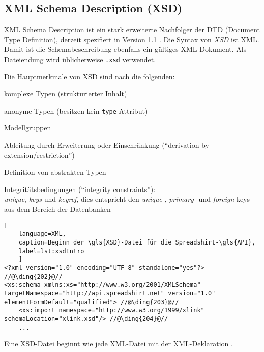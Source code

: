 \subsection{XML Schema Description (XSD)}
\label{sec:xsd}

\textsc{XML} Schema Description ist ein stark erweiterte Nachfolger der \gls{DTD} (Document Type Definition), derzeit spezifiert in Version 1.1 \cite{XMLSchema11Specification}. 
Die Syntax von \emph{\gls{XSD}} ist \gls{XML}. Damit ist die Schemabeschreibung ebenfalls ein gültiges \gls{XML}-Dokument. Als Dateiendung wird üblicherweise \texttt{.xsd} verwendet.

Die Hauptmerkmale von \gls{XSD} sind nach \cite[Kapitel 3.2][]{taxonomyXMLSchema} die folgenden:
\begin{compactitem}
    \item komplexe Typen (strukturierter Inhalt)
    \item anonyme Typen (besitzen kein \texttt{type}-Attribut)
    \item Modellgruppen
    \item Ableitung durch Erweiterung oder Einschränkung (\enquote{derivation by extension/restriction})
    \item Definition von abstrakten Typen
    \item Integritätsbedingungen (\enquote{integrity constraints}):\\
        \emph{unique}, \emph{keys} und \emph{keyref}, dies entspricht den \emph{unique-}, \emph{primary-} und \emph{foreign}-keys aus dem Bereich der Datenbanken        
\end{compactitem}

\begin{minipage}{\textwidth}
\begin{lstlisting}[
    language=XML,
    caption=Beginn der \gls{XSD}-Datei für die Spreadshirt-\gls{API},
    label=lst:xsdIntro
    ]
<?xml version="1.0" encoding="UTF-8" standalone="yes"?> //@\ding{202}@//
<xs:schema xmlns:xs="http://www.w3.org/2001/XMLSchema"  targetNamespace="http://api.spreadshirt.net" version="1.0" elementFormDefault="qualified"> //@\ding{203}@//
    <xs:import namespace="http://www.w3.org/1999/xlink" schemaLocation="xlink.xsd"/> //@\ding{204}@//
    ...
\end{lstlisting}
\end{minipage}

Eine \gls{XSD}-Datei beginnt wie jede \gls{XML}-Datei mit der \gls{XML}-Deklaration .

